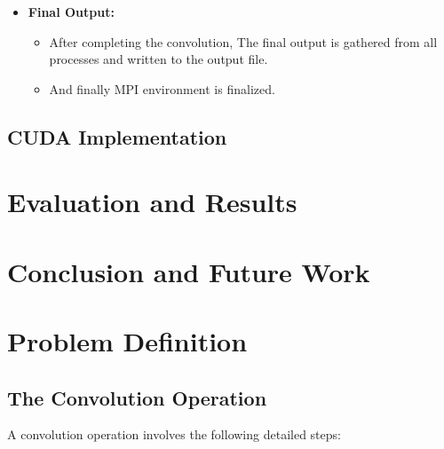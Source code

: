 \documentclass[conference, 10pt]{IEEEtran}
\begin{document}
\begin{itemize}
\begin{itemize}
\begin{itemize}
    \item \textbf{Final Output:}
    \begin{itemize}
        \item After completing the convolution, The final output is gathered from all processes and written to the output file.
        \item And finally MPI environment is finalized.
    \end{itemize}
\end{itemize}



\subsection{CUDA Implementation}







\section{Evaluation and Results}





\section{Conclusion and Future Work}






\section{Problem Definition}

\subsection{The Convolution Operation}
A convolution operation involves the following detailed steps:


\end{itemize}
\end{itemize}
\end{document}
